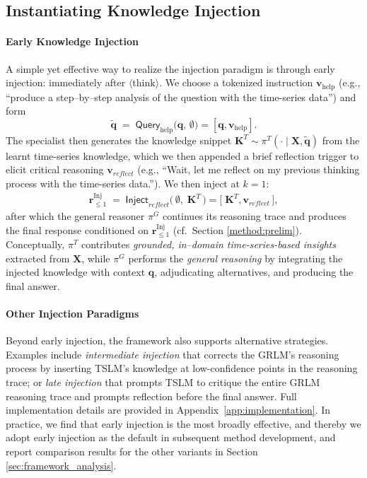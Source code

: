 \documentclass[twoside]{article}
\begin{document}
\subsection{Instantiating Knowledge Injection}
\label{method:early}

\paragraph{Early Knowledge Injection} A simple yet effective way to realize the injection paradigm is through early injection: immediately after \(\langle\mathrm{think}\rangle\).
We choose a {tokenized} instruction \(\mathbf{v}_{\mathrm{help}}\) (e.g., “produce a step–by–step analysis of the question with the time-series data”) and form
\[
\mathbf{\tilde{q}} \;=\; \mathsf{Query}_{\mathrm{help}}\!\big(\mathbf{q},\,\emptyset\big) = \left[\mathbf{q},\mathbf{v}_{\mathrm{help}}\right].
\]
The specialist then generates the knowledge snippet
\(
\mathbf{K}^{T} \sim \pi^{T}(\cdot \mid \mathbf{X},\mathbf{\tilde{q}})
\) from the learnt time-series knowledge,
which we then appended a brief reflection trigger to elicit critical reasoning $\mathbf{v}_{reflect}$ (e.g., “Wait, let me reflect on my previous thinking process with the time-series data.”). We then inject at \(k{=}1\):
\begin{align*}
\mathbf{r}^{\mathrm{Inj}}_{\le 1}
\;=\;
\mathsf{Inject}_{reflect} \big(\,\emptyset,\;{\mathbf{K}}^{T}\,\big)=
\big[\; {\mathbf{K}}^{T}, \boldsymbol{v}_{reflect}\,\big], 
\end{align*}
after which the general reasoner \(\pi^{G}\) continues its reasoning trace and produces the final response conditioned on \(\mathbf{r}^{\mathrm{Inj}}_{\le 1}\) (cf.\ Section \ref{method:prelim}). Conceptually, \(\pi^{T}\) contributes \emph{grounded, in–domain time-series-based insights} extracted from \(\mathbf{X}\), while \(\pi^{G}\) performs the \emph{general reasoning} by integrating the injected knowledge with context \(\mathbf{q}\),  adjudicating alternatives, and producing the final answer. 

\paragraph{Other Injection Paradigms}
Beyond early injection, the framework also supports alternative strategies. Examples include \textit{intermediate injection} that corrects the GRLM's reasoning process by inserting TSLM's knowledge at low-confidence points in the reasoning trace; or \textit{late injection} that prompts TSLM to critique the entire GRLM reasoning trace and prompts reflection before the final answer. Full implementation details are provided in Appendix~\ref{app:implementation}. In practice, we find that early injection is the most broadly effective, and thereby we adopt early injection as the default in subsequent method development, and report comparison results for the other variants in Section \ref{sec:framework_analysis}.
\end{document}
